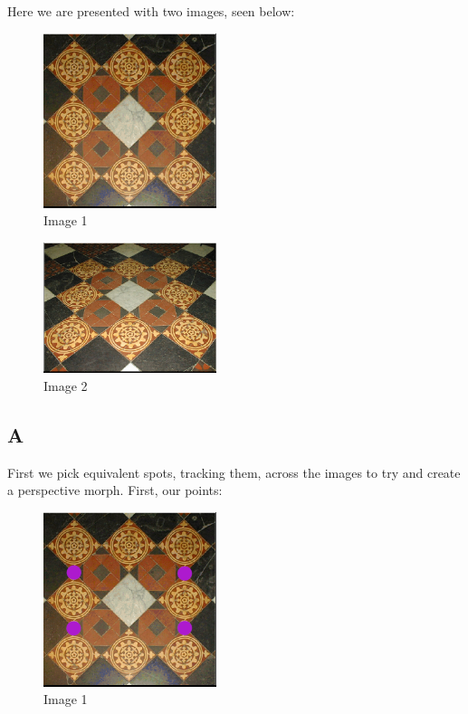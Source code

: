 \documentclass{article}
\begin{document}
Here we are presented with two images, seen below:

\begin{figure}[H]
    \centering
    \includegraphics[width = 0.45\textwidth]{imgs/2-1.png}
    \caption{Image 1}
    \label{fig:prob2-1}
\end{figure}

\begin{figure}[H]
    \centering
    \includegraphics[width = 0.45\textwidth]{imgs/2-2.png}
    \caption{Image 2}
    \label{fig:prob2-2}
\end{figure}

\subsection*{A}

First we pick equivalent spots, tracking them, across the images to try and create a perspective morph. First, our points:

\begin{figure}[H]
    \centering
    \includegraphics[width = 0.45\textwidth]{imgs/2-1-dots.png}
    \caption{Image 1}
    \label{fig:prob2-1a}
\end{figure}
\end{document}

